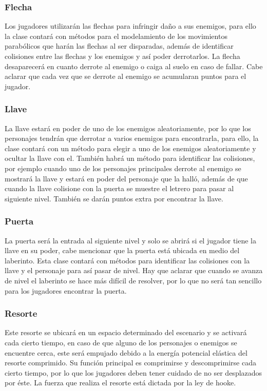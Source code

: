 \documentclass{article}
\begin{document}
\subsubsection{Flecha}

 Los jugadores utilizarán las flechas para infringir daño a sus enemigos, para ello la clase contará con métodos para el modelamiento de los movimientos parabólicos que harán las flechas al ser disparadas, además de identificar colisiones entre las flechas y los enemigos y así poder derrotarlos. La flecha desaparecerá en cuanto derrote al enemigo o caiga al suelo en caso de fallar. Cabe aclarar que cada vez que se derrote al enemigo se acumularan puntos para el jugador.
 

\subsubsection{Llave}

La llave estará en poder de uno de los enemigos aleatoriamente, por lo que los personajes tendrán que derrotar a varios enemigos para encontrarla, para ello, la clase contará con un método para elegir a uno de los enemigos aleatoriamente y ocultar la llave con el. También habrá un método para identificar las colisiones, por ejemplo cuando uno de los personajes principales derrote al enemigo se mostrará la llave y estará en poder del personaje que la halló, además de que cuando la llave colisione con la puerta se muestre el letrero para pasar al siguiente nivel. También se darán puntos extra por encontrar la llave.


\subsubsection{Puerta}

 La puerta será la entrada al siguiente nivel y solo se abrirá si el jugador tiene la llave en su poder, cabe mencionar que la puerta está ubicada en medio del laberinto. Esta clase contará con métodos para identificar las colisiones con la llave y el personaje para así pasar de nivel. Hay que aclarar que cuando se avanza de nivel el laberinto se hace más difícil de resolver, por lo que no será tan sencillo para los jugadores encontrar la puerta.


\subsubsection{Resorte}

Este resorte se ubicará en un espacio determinado del escenario y se activará cada cierto tiempo, en caso de que alguno de los personajes o enemigos se encuentre cerca, este será empujado debido a la energía potencial elástica del resorte comprimido. Su función principal es comprimirse y descomprimirse cada cierto tiempo, por lo que los jugadores deben tener cuidado de no ser desplazados por éste. La fuerza que realiza el resorte está dictada por la ley de hooke.
\end{document}
